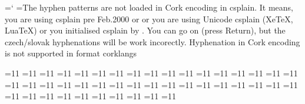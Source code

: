 %


\let\corkencoded\font %

\ifx\chyph\undefined\else \ifx\czCork\undefined 
  {\newlinechar=`^^J
   \errhelp={The hyphen patterns are not loaded in Cork encoding in csplain.^^J
            It means, you are using csplain pre Feb.2000 or^^J
            or you are using Unicode csplain (XeTeX, LuaTeX) or^^J
            you initialised csplain by \let\Cork=\relax.^^J
            You can go on (press Return), but the czech/slovak^^J
            hyphenations will be work incorectly.}
  \errmessage
  {Hyphenation in Cork encoding is not supported in format} %
  } 
\fi\fi
\csname corklangs\endcsname

=11  %
=11  %
=11  %
=11  %
=11  %
=11  %
=11  %
=11  %
=11  %
=11  %
=11  %
=11  %
=11  %
=11  %
=11  %
=11  %
=11  %
=11  %
=11  %
=11  %
=11  %
=11  %
=11  %
=11  %
=11  %
=11  %
=11  %
=11  %
=11  %
=11  %
=11  %
=11  %
=11  %
=11  %
=11  %
=11  %
=11  %
=11  %
=11  %
=11  %
=11  %
=11  %
=11  %
=11  %
		
